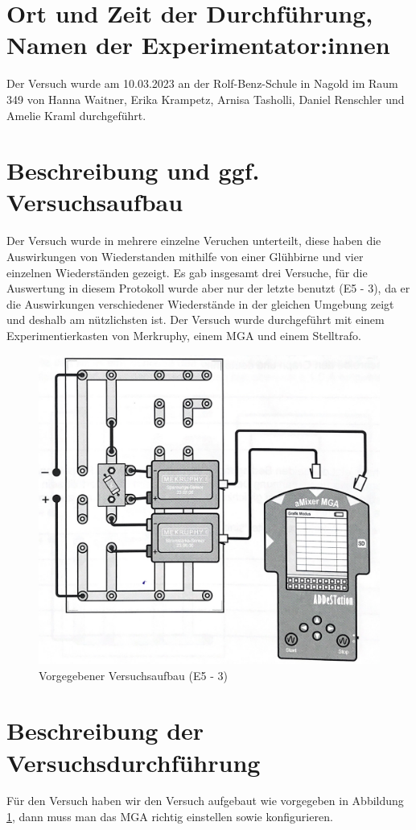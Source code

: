 \documentclass[10pt]{article}
\begin{document}
\section{Ort und Zeit der Durchführung, Namen der Experimentator:innen}
Der Versuch wurde am 10.03.2023 an der Rolf-Benz-Schule in Nagold im Raum 349 von Hanna Waitner, Erika Krampetz, Arnisa Tasholli, Daniel Renschler und Amelie Kraml durchgeführt. 


\section{Beschreibung und ggf. Versuchsaufbau}
Der Versuch wurde in mehrere einzelne Veruchen unterteilt, diese haben die Auswirkungen von Wiederstanden mithilfe von einer Glühbirne und vier einzelnen Wiederständen gezeigt.
Es gab insgesamt drei Versuche, für die Auswertung in diesem Protokoll wurde aber nur der letzte benutzt (E5 - 3), da er die Auswirkungen verschiedener Wiederstände in der gleichen Umgebung zeigt und deshalb am nützlichsten ist.
Der Versuch wurde durchgeführt mit einem Experimentierkasten von Merkruphy, einem MGA und einem Stelltrafo.

\begin{figure}[htb]
    \centering
    \includegraphics[width=.5\textwidth]{aufbau.jpg}
    \caption{Vorgegebener Versuchsaufbau (E5 - 3)}
    \label{fig:versuchsaufbau}
\end{figure}


\section{Beschreibung der Versuchsdurchführung}
Für den Versuch haben wir den Versuch aufgebaut wie vorgegeben in Abbildung \ref{fig:versuchsaufbau}, dann muss man das MGA richtig einstellen sowie konfigurieren.
\end{document}
